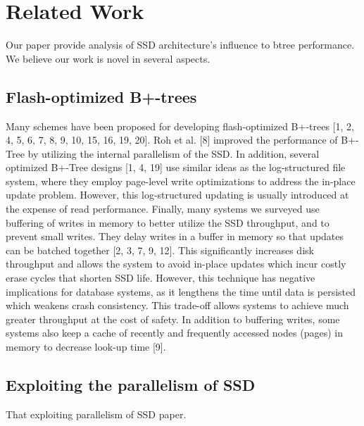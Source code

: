 
\section{Related Work}
Our paper provide analysis of SSD architecture's influence to btree performance. We believe our work is novel in several aspects.

\subsection{Flash-optimized B+-trees}
Many schemes have been proposed for developing flash-optimized B+-trees [1, 2, 4, 5, 6, 7, 8, 9, 10, 15, 16, 19, 20].
Roh et al. [8] improved the performance of B+-Tree by utilizing the internal parallelism of the SSD.
In addition, several optimized B+-Tree designs [1, 4, 19] use similar ideas as the log-structured file system, where they employ page-level write optimizations to address the in-place update problem.
However, this log-structured updating is usually introduced at the expense of read performance.
Finally, many systems we surveyed use buffering of writes in memory to better utilize the SSD throughput, and to prevent small writes.
They delay writes in a buffer in memory so that updates can be batched together [2, 3, 7, 9, 12].
This significantly increases disk throughput and allows the system to avoid in-place updates which incur costly erase cycles that shorten SSD life.
However, this technique has negative implications for database systems, as it lengthens the time until data is persisted which weakens crash consistency.
This trade-off allows systems to achieve much greater throughput at the cost of safety.
In addition to buffering writes, some systems also keep a cache of recently and frequently accessed nodes (pages) in memory to decrease look-up time [9].\\

\subsection{Exploiting the parallelism of SSD}
That exploiting parallelism of SSD paper.